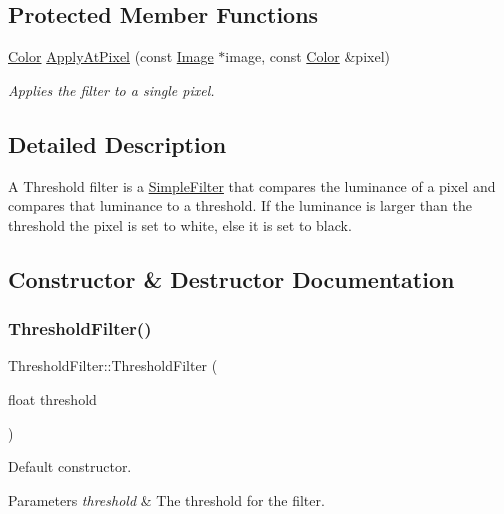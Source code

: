 \subsection*{Protected Member Functions}
\begin{DoxyCompactItemize}
\item 
\hyperlink{classColor}{Color} \hyperlink{classThresholdFilter_a98db75bfcd26f1f274ce4014d3de1baa}{Apply\+At\+Pixel} (const \hyperlink{classImage}{Image} $\ast$image, const \hyperlink{classColor}{Color} \&pixel)
\begin{DoxyCompactList}\small\item\em Applies the filter to a single pixel. \end{DoxyCompactList}\end{DoxyCompactItemize}


\subsection{Detailed Description}
A Threshold filter is a \hyperlink{classSimpleFilter}{Simple\+Filter} that compares the luminance of a pixel and compares that luminance to a threshold. If the luminance is larger than the threshold the pixel is set to white, else it is set to black. 

\subsection{Constructor \& Destructor Documentation}
\mbox{\label{classThresholdFilter_ac13253e54ab2cb9470c912dfc90c71e9}} 
\subsubsection{\texorpdfstring{Threshold\+Filter()}{ThresholdFilter()}}
{\footnotesize\ttfamily Threshold\+Filter\+::\+Threshold\+Filter (\begin{DoxyParamCaption}\item[{float}]{threshold }\end{DoxyParamCaption})}



Default constructor. 


\begin{DoxyParams}{Parameters}
{\em threshold} & The threshold for the filter. \\
\hline
\end{DoxyParams}


